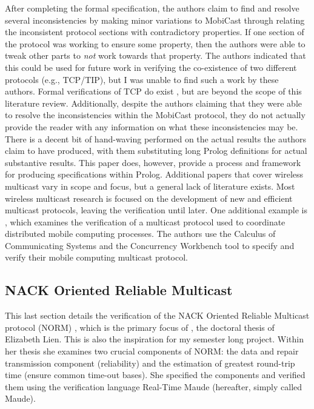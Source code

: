 \documentclass[11pt, journal]{IEEEtran}
\begin{document}
\bigbreak
After completing the formal specification, the authors claim to find and resolve several inconsistencies by making minor variations to MobiCast through relating the inconsistent protocol sections with contradictory properties. If one section of the protocol was working to ensure some property, then the authors were able to tweak other parts to \textit{not} work towards that property. The authors indicated that this could be used for future work in verifying the co-existence of two different protocols (e.g., TCP/TIP), but I was unable to find such a work by these authors. Formal verifications of TCP do exist \cite{Smith1997}, but are beyond the scope of this literature review. Additionally, despite the authors claiming that they were able to resolve the inconsistencies within the MobiCast protocol, they do not actually provide the reader with any information on what these inconsistencies may be. There is a decent bit of hand-waving performed on the actual results the authors claim to have produced, with them substituting long Prolog definitions for actual substantive results. This paper does, however, provide a process and framework for producing specifications within Prolog.
\bigbreak
Additional papers that cover wireless multicast vary in scope and focus, but a general lack of literature exists. Most wireless multicast research is focused on the development of new and efficient multicast protocols, leaving the verification until later. One additional example is \cite{Anastasi2000}, which examines the verification of a multicast protocol used to coordinate distributed mobile computing processes. The authors use the Calculus of Communicating Systems \cite{Milner1989} and the Concurrency Workbench tool \cite{Cleaveland1996} to specify and verify their mobile computing multicast protocol. 
\bigbreak
\subsection{NACK Oriented Reliable Multicast}
This last section details the verification of the NACK Oriented Reliable Multicast protocol (NORM) \cite{rfc5740}, which is the primary focus of \cite{Lien2004FormalMA}, the doctoral thesis of Elizabeth Lien. This is also the inspiration for my semester long project. Within her thesis she examines two crucial components of NORM: the data and repair transmission component (reliability) and the estimation of greatest round-trip time (ensure common time-out bases). She specified the components and verified them using the verification language Real-Time Maude (hereafter, simply called Maude).
\bigbreak
\end{document}
